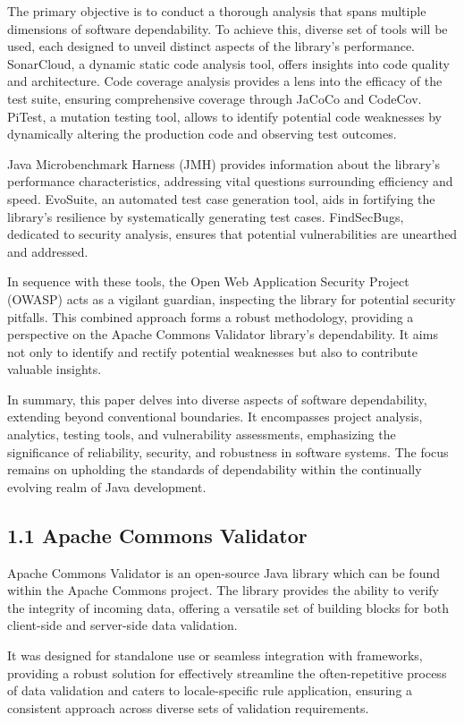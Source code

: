 \documentclass{sigchi}
\begin{document}
The primary objective is to conduct a thorough analysis that spans multiple dimensions of software dependability. To achieve this, diverse set of tools will be used, each designed to unveil distinct aspects of the library's performance. SonarCloud, a dynamic static code analysis tool, offers insights into code quality and architecture. Code coverage analysis provides a lens into the efficacy of the test suite, ensuring comprehensive coverage through JaCoCo and CodeCov. PiTest, a mutation testing tool, allows to identify potential code weaknesses by dynamically altering the production code and observing test outcomes.

Java Microbenchmark Harness (JMH) provides information about the library's performance characteristics, addressing vital questions surrounding efficiency and speed. EvoSuite, an automated test case generation tool, aids in fortifying the library's resilience by systematically generating test cases. FindSecBugs, dedicated to security analysis, ensures that potential vulnerabilities are unearthed and addressed.

In sequence with these tools, the Open Web Application Security Project (OWASP) acts as a vigilant guardian, inspecting the library for potential security pitfalls. This combined approach forms a robust methodology, providing a perspective on the Apache Commons Validator library's dependability. It aims not only to identify and rectify potential weaknesses but also to contribute valuable insights.

In summary, this paper delves into diverse aspects of software dependability, extending beyond conventional boundaries.  It encompasses project analysis, analytics, testing tools, and vulnerability assessments, emphasizing the significance of reliability, security, and robustness in software systems. The focus remains on upholding the standards of dependability within the continually evolving realm of Java development. 

\subsection{1.1 Apache Commons Validator}
Apache Commons Validator \cite{apache-commons-validator} is an open-source Java library which can be found within the Apache Commons project. The library provides the ability to verify the integrity of incoming data, offering a versatile set of building blocks for both client-side and server-side data validation. 

It was designed for standalone use or seamless integration with frameworks, providing a robust solution for effectively streamline the often-repetitive process of data validation and caters to locale-specific rule application, ensuring a consistent approach across diverse sets of validation requirements.
\end{document}
